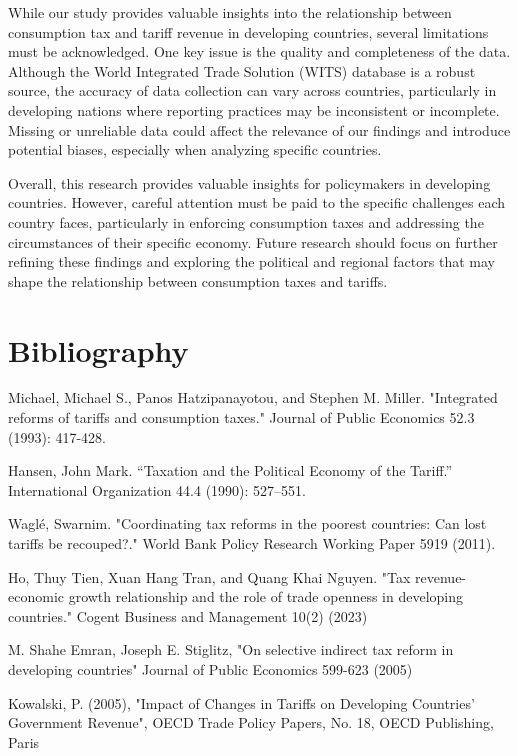 \documentclass[12pt]{article}
\begin{document}
While our study provides valuable insights into the relationship between consumption tax and tariff revenue in developing countries, several limitations must be acknowledged. One key issue is the quality and completeness of the data. Although the World Integrated Trade Solution (WITS) database is a robust source, the accuracy of data collection can vary across countries, particularly in developing nations where reporting practices may be inconsistent or incomplete. Missing or unreliable data could affect the relevance of our findings and introduce potential biases, especially when analyzing specific countries. 

Overall, this research provides valuable insights for policymakers in developing countries. However, careful attention must be paid to the specific challenges each country faces, particularly in enforcing consumption taxes and addressing the circumstances of their specific economy. Future research should focus on further refining these findings and exploring the political and regional factors that may shape the relationship between consumption taxes and tariffs.



\newpage
\section*{Bibliography}
\singlespacing
\setlength\bibsep{0pt}

Michael, Michael S., Panos Hatzipanayotou, and Stephen M. Miller. "Integrated reforms of tariffs and consumption taxes." Journal of Public Economics 52.3 (1993): 417-428.

Hansen, John Mark. “Taxation and the Political Economy of the Tariff.” International Organization 44.4 (1990): 527–551.

Waglé, Swarnim. "Coordinating tax reforms in the poorest countries: Can lost tariffs be recouped?." World Bank Policy Research Working Paper 5919 (2011).

Ho, Thuy Tien, Xuan Hang Tran, and Quang Khai Nguyen. "Tax revenue-economic growth relationship and the role of trade openness in developing countries." Cogent Business and Management 10(2) (2023)

M. Shahe Emran, Joseph E. Stiglitz, "On selective indirect tax reform in developing countries" Journal of Public Economics 599-623 (2005)

Kowalski, P. (2005), "Impact of Changes in Tariffs on Developing Countries' Government Revenue", OECD Trade Policy Papers, No. 18, OECD Publishing, Paris
\end{document}
